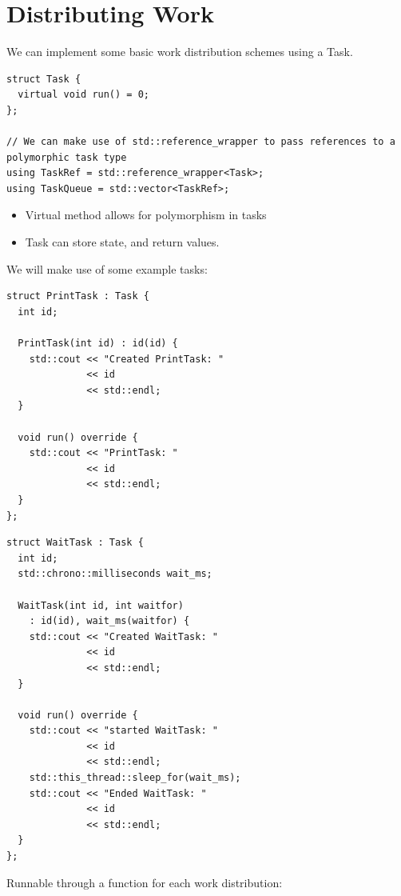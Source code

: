 \section{Distributing Work}
We can implement some basic work distribution schemes using a Task.
\begin{verbatim}
struct Task {
  virtual void run() = 0;
};

// We can make use of std::reference_wrapper to pass references to a polymorphic task type
using TaskRef = std::reference_wrapper<Task>;
using TaskQueue = std::vector<TaskRef>;
\end{verbatim}
\begin{itemize}
    \item Virtual method allows for polymorphism in tasks
    \item Task can store state, and return values.
\end{itemize}
We will make use of some example tasks:
\\ \begin{minipage}[t]{.49\textwidth}
    \begin{verbatim}
struct PrintTask : Task {
  int id;

  PrintTask(int id) : id(id) {
    std::cout << "Created PrintTask: " 
              << id 
              << std::endl;
  }

  void run() override { 
    std::cout << "PrintTask: " 
              << id 
              << std::endl;
  }
};
    \end{verbatim}
\end{minipage}
\hfill \begin{minipage}[t]{.49\textwidth}
    \begin{verbatim}
struct WaitTask : Task {
  int id;
  std::chrono::milliseconds wait_ms;

  WaitTask(int id, int waitfor) 
    : id(id), wait_ms(waitfor) {
    std::cout << "Created WaitTask: " 
              << id 
              << std::endl;
  }

  void run() override {
    std::cout << "started WaitTask: " 
              << id 
              << std::endl;
    std::this_thread::sleep_for(wait_ms);
    std::cout << "Ended WaitTask: " 
              << id 
              << std::endl;
  }
};
    \end{verbatim}
\end{minipage}
Runnable through a function for each work distribution:
